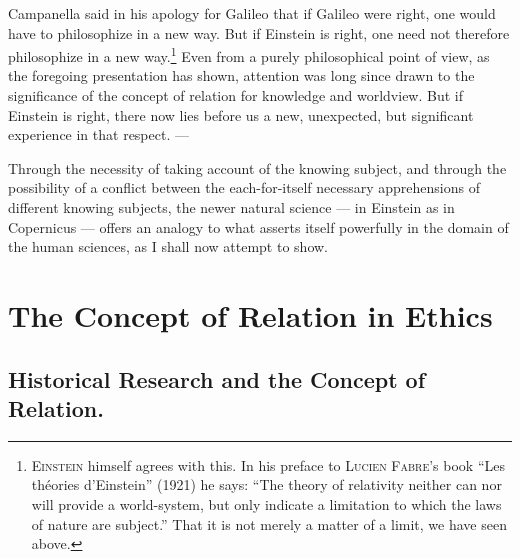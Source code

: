\documentclass[12pt]{article}
\newcommand{\opage}[1]{\marginnote{\footnotesize\textit{[#1]}}}
\begin{document}
Campanella said in his apology for Galileo that if \opage{77}Galileo were right,
one would have to philosophize in a new way. But if Einstein is right,
one need not therefore philosophize in a new
way.\footnote{\textsc{Einstein} himself agrees with this. In his preface to
  \textsc{Lucien Fabre}'s book ``Les théories d'Einstein'' (1921) he says: ``The theory
  of relativity neither can nor will provide a world-system, but only
  indicate a limitation to which the laws of nature are subject.'' That it
  is not merely a matter of a limit, we have seen above.}
Even from a purely philosophical point of view, as the foregoing
presentation has shown, attention was long since drawn to the significance
of the concept of relation for knowledge and worldview. But if Einstein is
right, there now lies before us a new, unexpected, but significant
experience in that respect. ---

Through the necessity of taking account of the knowing subject, and
through the possibility of a conflict between the each-for-itself
necessary apprehensions of different knowing subjects, the newer natural
science --- in Einstein as in Copernicus --- offers an analogy to what
asserts itself powerfully in the domain of the human sciences, as I shall
now attempt to show.



\section{The Concept of Relation in Ethics}
\label{sec:4}

\subsection{Historical Research and the Concept of Relation.}
\label{sec:4a}
\end{document}
